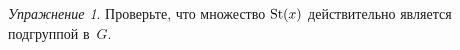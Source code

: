 \documentclass[a4paper,10pt]{amsart}
\def\St{{\rm St}}%
\def\RR{{\mathbb R}}%
\def\SL{{\rm SL}}%
\def\SL{{\rm SL}}
\theoremstyle{definition}
\theoremstyle{remark}
\newtheorem{exercise}{Упражнение}
\newtheorem{example}{Пример}
\begin{document}
\begin{exercise}
Проверьте, что множество $\St(x)$ действительно является подгруппой
в~$G$.
\end{exercise}

\end{document}
